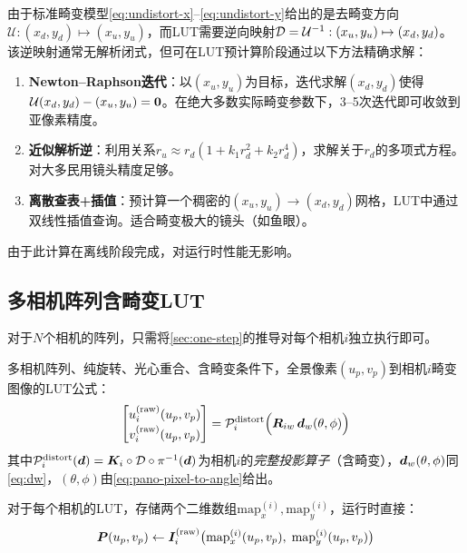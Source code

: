 由于标准畸变模型\eqref{eq:undistort-x}--\eqref{eq:undistort-y}给出的是去畸变方向$\mathcal{U}: (x_d,y_d) \mapsto (x_u,y_u)$，而LUT需要逆向映射$\mathcal{D} = \mathcal{U}^{-1}: (x_u,y_u) \mapsto (x_d,y_d)$。该逆映射通常无解析闭式，但可在LUT预计算阶段通过以下方法精确求解：

\begin{enumerate}[label=方法\arabic*:, leftmargin=*]
  \item \textbf{Newton--Raphson迭代}：以$(x_u, y_u)$为目标，迭代求解$(x_d, y_d)$使得$\mathcal{U}(x_d, y_d) - (x_u, y_u) = \bm{0}$。在绝大多数实际畸变参数下，3--5次迭代即可收敛到亚像素精度。
  \item \textbf{近似解析逆}：利用关系$r_u \approx r_d(1 + k_1 r_d^2 + k_2 r_d^4)$，求解关于$r_d$的多项式方程。对大多民用镜头精度足够。
  \item \textbf{离散查表+插值}：预计算一个稠密的$(x_u, y_u) \to (x_d, y_d)$网格，LUT中通过双线性插值查询。适合畸变极大的镜头（如鱼眼）。
\end{enumerate}

由于此计算在离线阶段完成，对运行时性能无影响。

\subsection{多相机阵列含畸变LUT}
\label{sec:multi-rot-dist}

对于$N$个相机的阵列，只需将\cref{sec:one-step}的推导对每个相机$i$独立执行即可。

\begin{finalbox}
多相机阵列、纯旋转、光心重合、含畸变条件下，全景像素$(u_p,v_p)$到相机$i$畸变图像的LUT公式：
\[
\begin{bmatrix}
u_i^{\text{(raw)}}(u_p,v_p) \\[2pt] v_i^{\text{(raw)}}(u_p,v_p)
\end{bmatrix}
=
\mathcal{P}_i^{\text{distort}}\Bigl(\bm{R}_{iw}\,\bm{d}_w(\theta,\phi)\Bigr)
\]
其中$\mathcal{P}_i^{\text{distort}}(\bm{d}) = \bm{K}_i \circ \mathcal{D} \circ \pi^{-1}(\bm{d})$为相机$i$的\emph{完整投影算子}（含畸变），$\bm{d}_w(\theta,\phi)$同\eqref{eq:dw}，$(\theta,\phi)$由\eqref{eq:pano-pixel-to-angle}给出。

对于每个相机的LUT，存储两个二维数组$\text{map}_x^{(i)},\text{map}_y^{(i)}$，运行时直接：
\[
\bm{P}(u_p,v_p) \leftarrow \bm{I}_i^{\text{(raw)}}\bigl(\text{map}_x^{(i)}(u_p,v_p),\; \text{map}_y^{(i)}(u_p,v_p)\bigr)
\]
\end{finalbox}
